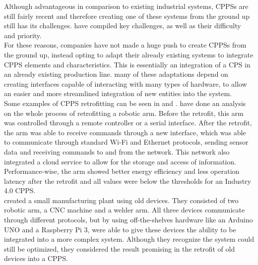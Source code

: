 Although advantageous in comparison to existing industrial systems, \gls{CPPS}s are still fairly recent and therefore creating one of these systems from the ground up still has its challenges. \citeauthor{LEITAO201611} \cite{LEITAO201611} have compiled key challenges, as well as their difficulty and priority.\\ %

For these reasons, companies have not made a huge push to create \gls{CPPS}s from the ground up, instead opting to adapt their already existing systems to integrate \gls{CPPS} elements and characteristics. This is essentially an integration of a \gls{CPS} in an already existing production line. many of these adaptations depend on creating interfaces capable of interacting with many types of hardware, to allow an easier and more streamlined integration of new entities into the system.\\

Some examples of \gls{CPPS} retrofitting can be seen in \citeauthor{CARDIN201911} \cite{CARDIN201911} and \citeauthor{8328326} \cite{8328326}. \citeauthor{CARDIN201911} \cite{CARDIN201911} have done an analysis on the whole process of retrofitting a robotic arm. Before the retrofit, this arm was controlled through a remote controller or a serial interface. After the retrofit, the arm was able to receive commands through a new interface, which was able to communicate through standard Wi-Fi and Ethernet protocols, sending sensor data and receiving commands to and from the network. This network also integrated a cloud service to allow for the storage and access of information. Performance-wise, the arm showed better energy efficiency and less operation latency after the retrofit and all values were below the thresholds for an Industry 4.0 \gls{CPPS}.\\

\citeauthor{8328326} \cite{8328326} created a small manufacturing plant using old devices. They consisted of two robotic arm, a CNC machine and a welder arm. All three devices communicate through different protocols, but by using off-the-shelves hardware like an Arduino UNO and a Raspberry Pi 3, \citeauthor{8328326} were able to give these devices the ability to be integrated into a more complex system. Although they recognize the system could still be optimized, they considered the result promising in the retrofit of old devices into a \gls{CPPS}.

